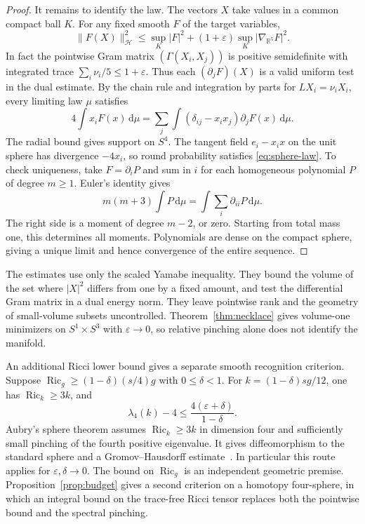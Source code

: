 \documentclass[11pt]{article}
\numberwithin{equation}{section}
\DeclareMathOperator{\Ric}{Ric}
\newcommand{\dd}{\mathrm{d}}
\newcommand{\e}{\varepsilon}
\newcommand{\RR}{\mathbb{R}}
\newcommand{\abs}[1]{\lvert #1\rvert}
\newcommand{\norm}[1]{\lVert #1\rVert}
\begin{document}
\begin{proof}
It remains to identify the law. The vectors \(X\) take values
in a common compact ball \(K\). For any fixed smooth \(F\)
of the target variables,
\[
 \norm{F(X)}_{\mathcal H}^2\le
  \sup_K\abs F^2+(1+\e)\sup_K\abs{\nabla_{\RR^5}F}^2 .
\]
In fact the pointwise Gram matrix \((\Gamma(X_i,X_j))\) is
positive semidefinite with integrated trace
\(\sum_i\nu_i/5\le1+\e\). Thus each \((\partial_jF)(X)\)
is a valid uniform test in the dual estimate.
By the chain rule and integration by parts for
\(LX_i=\nu_iX_i\), every limiting law \(\mu\) satisfies
\begin{equation}\label{eq:sphere-law}
 4\int x_i F(x)\,\dd\mu=
    \sum_j\int(\delta_{ij}-x_ix_j)\partial_jF(x)\,\dd\mu .
\end{equation}
The radial bound gives support on \(S^4\).
The tangent field \(e_i-x_i x\) on the unit sphere has
divergence \(-4x_i\), so round probability satisfies
\eqref{eq:sphere-law}. To check uniqueness, take
\(F=\partial_i P\) and sum in \(i\) for each homogeneous
polynomial \(P\) of degree \(m\ge1\).
Euler's identity gives
\[
 m(m+3)\int P\,\dd\mu=\int\sum_i\partial_{ii}P\,\dd\mu.
\]
The right side is a moment of degree \(m-2\), or zero.
Starting from total mass one, this determines all moments.
Polynomials are dense on the compact sphere, giving a unique
limit and hence convergence of the entire sequence.
\end{proof}

The estimates use only the scaled Yamabe inequality.
They bound the volume of the set where \(\abs X^2\) differs
from one by a fixed amount, and test the differential Gram
matrix in a dual energy norm. They leave pointwise rank and
the geometry of small-volume subsets uncontrolled.
Theorem~\ref{thm:necklace} gives volume-one minimizers on
\(S^1\times S^3\) with \(\e\to0\), so relative pinching alone does
not identify the manifold.

An additional Ricci lower bound gives a separate smooth
recognition criterion. Suppose
\(\Ric_g\ge(1-\delta)(s/4)g\) with \(0\le\delta<1\).
For \(k=(1-\delta)sg/12\), one has \(\Ric_k\ge3k\), and
\[
 \lambda_4(k)-4\le\frac{4(\e+\delta)}{1-\delta}.
\]
Aubry's sphere theorem assumes \(\Ric_k\ge3k\) in dimension four
and sufficiently small pinching of the fourth positive eigenvalue.
It gives diffeomorphism to the standard sphere and a
Gromov--Hausdorff estimate~\cite[Theorem~1]{Aubry2005Pincement}.
In particular this route applies for \(\e,\delta\to0\).
The bound on \(\Ric_g\) is an independent geometric premise.
Proposition~\ref{prop:budget} gives a second criterion on a homotopy
four-sphere, in which an integral bound on the trace-free Ricci
tensor replaces both the pointwise bound and the spectral pinching.
\end{document}
